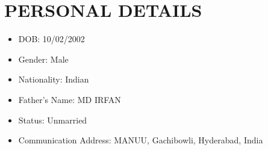 \documentclass[letterpaper,11pt]{article}
\newcommand{\resumeItem}[1]{
  \item\small{
    {#1 \vspace{-2pt}}
  }
}
\newcommand{\resumeSubHeadingListStart}{\begin{itemize}[leftmargin=0.0in, label={}]}
\newcommand{\resumeSubHeadingListEnd}{\end{itemize}}
\begin{document}
\section{PERSONAL DETAILS}
    \resumeSubHeadingListStart
        \resumeItem{\normalsize{DOB: 10/02/2002}}
        \resumeItem{\normalsize{Gender: Male}}
        \resumeItem{\normalsize{Nationality: Indian}}
        \resumeItem{\normalsize{Father's Name: MD IRFAN}}
        \resumeItem{\normalsize{Status: Unmarried}}
        \resumeItem{\normalsize{Communication Address: MANUU, Gachibowli, Hyderabad, India}}
    \resumeSubHeadingListEnd
\end{document}
